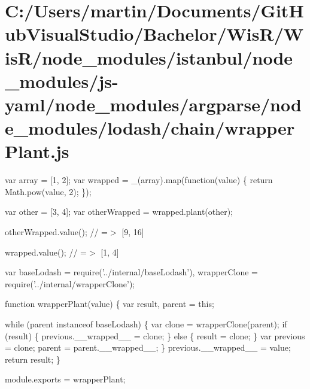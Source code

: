 \hypertarget{_c_1_2_users_2martin_2_documents_2_git_hub_visual_studio_2_bachelor_2_wis_r_2_wis_r_2node_module1da026154b072d08e7a806397c3337fa}{}\section{C\+:/\+Users/martin/\+Documents/\+Git\+Hub\+Visual\+Studio/\+Bachelor/\+Wis\+R/\+Wis\+R/node\+\_\+modules/istanbul/node\+\_\+modules/js-\/yaml/node\+\_\+modules/argparse/node\+\_\+modules/lodash/chain/wrapper\+Plant.\+js}
var array = \mbox{[}1, 2\mbox{]}; var wrapped = \+\_\+(array).map(function(value) \{ return Math.\+pow(value, 2); \});

var other = \mbox{[}3, 4\mbox{]}; var other\+Wrapped = wrapped.\+plant(other);

other\+Wrapped.\+value(); // =$>$ \mbox{[}9, 16\mbox{]}

wrapped.\+value(); // =$>$ \mbox{[}1, 4\mbox{]}


\begin{DoxyCodeInclude}
var baseLodash = require(\textcolor{stringliteral}{'../internal/baseLodash'}),
    wrapperClone = require(\textcolor{stringliteral}{'../internal/wrapperClone'});

\textcolor{keyword}{function} wrapperPlant(value) \{
  var result,
      parent = \textcolor{keyword}{this};

  \textcolor{keywordflow}{while} (parent instanceof baseLodash) \{
    var clone = wrapperClone(parent);
    \textcolor{keywordflow}{if} (result) \{
      previous.\_\_wrapped\_\_ = clone;
    \} \textcolor{keywordflow}{else} \{
      result = clone;
    \}
    var previous = clone;
    parent = parent.\_\_wrapped\_\_;
  \}
  previous.\_\_wrapped\_\_ = value;
  \textcolor{keywordflow}{return} result;
\}

module.exports = wrapperPlant;
\end{DoxyCodeInclude}
 